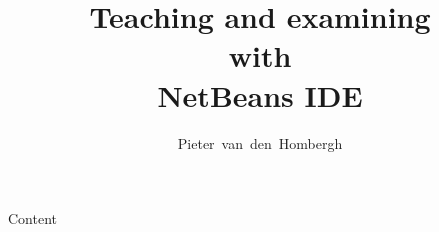 \documentclass{beamer}
\author[HOM]{Pieter~van~den~Hombergh}
\title{Teaching and \textbf{examining} \\
  with
  \\\raisebox{-.2\baselineskip}{\netbeansicon{\baselineskip}}\textbf{ NetBeans IDE}}
\begin{document}
\frame{\titlepage}
\begin{frame}{Content}
  \tableofcontents
\end{frame}

\end{document}
